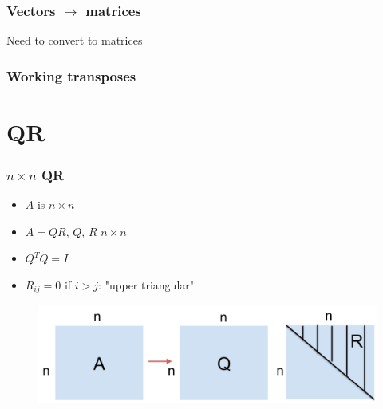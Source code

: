 \documentclass{beamer}
\begin{document}
\begin{frame}
\frametitle{Vectors $\to$ matrices}

Need to convert to matrices


\end{frame}

\begin{frame}
\frametitle{Working transposes}


\end{frame}


\section{QR}

\begin{frame}
\frametitle{$n \times n$ QR}

\begin{itemize}
\item $A$ is $n \times n$
\item $A = QR$, $Q$, $R$ $n \times n$
\item $Q^TQ = I$
\item $R_{ij} = 0$ if $i > j$: "upper triangular"
\end{itemize}

\begin{figure}
\includegraphics[scale=0.4]{figs/qr.pdf}
\end{figure}

\end{frame}
\end{document}
